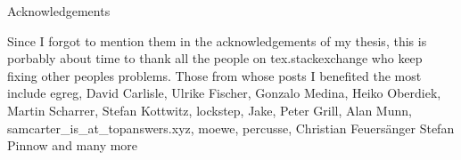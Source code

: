 
\cleardoublepage
\thispagestyle{empty}

{}

\begin{center}
{\color{accentcolor2} \mainregular \Huge Acknowledgements} 
\end{center}
\vspace{1cm}

Since I forgot to mention them in the acknowledgements of my thesis, this is porbably about time to thank all the people on tex.stackexchange who keep fixing other peoples problems. Those from whose posts I benefited the most include egreg, David Carlisle, Ulrike Fischer, Gonzalo Medina, 
Heiko Oberdiek, Martin Scharrer, Stefan Kottwitz, lockstep, Jake, Peter Grill, Alan Munn, samcarter\_is\_at\_topanswers.xyz, moewe, percusse, Christian Feuers\"anger Stefan Pinnow and many more